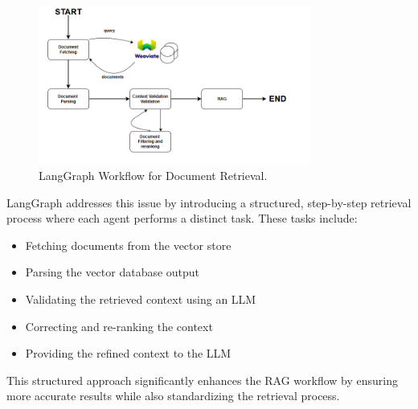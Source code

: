 \begin{figure}[h]
    \centering
    \includegraphics[width=0.8\textwidth]{IMAGES/immagine_2025-03-22_165130054.png}
    \caption{LangGraph Workflow for Document Retrieval.}
\end{figure}


LangGraph addresses this issue by introducing a structured, step-by-step retrieval process where each agent performs a distinct task. These tasks include:
\begin{itemize}
    \item Fetching documents from the vector store
    \item Parsing the vector database output
    \item Validating the retrieved context using an LLM
    \item Correcting and re-ranking the context
    \item Providing the refined context to the LLM
\end{itemize}
This structured approach significantly enhances the RAG workflow by ensuring more accurate results while also standardizing the retrieval process.

